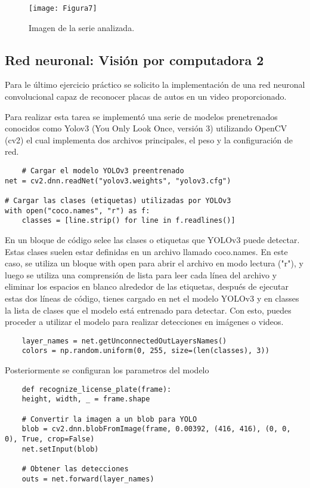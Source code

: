 \documentclass[a4paper,
               ]{jacow}
\begin{document}
\begin{figure}[!htb]
   \centering
   \captionsetup{justification=centering}
    \texttt{[image: Figura7]}
    \caption{Imagen de la serie analizada.}
\end{figure}

\subsection{Red neuronal: Visión por computadora 2}
Para le último ejercicio práctico se solicito la implementación de una red neuronal convolucional capaz de reconocer placas de autos en un video proporcionado. 

Para realizar esta tarea se implementó una serie de modelos prenetrenados conocidos como Yolov3 (You Only Look Once, versión 3) utilizando OpenCV (cv2) el cual implementa dos archivos principales, el peso y la configuración de red.

\begin{lstlisting}
    # Cargar el modelo YOLOv3 preentrenado
net = cv2.dnn.readNet("yolov3.weights", "yolov3.cfg")

# Cargar las clases (etiquetas) utilizadas por YOLOv3
with open("coco.names", "r") as f:
    classes = [line.strip() for line in f.readlines()]
\end{lstlisting}

En un bloque de código selee las clases o etiquetas que YOLOv3 puede detectar. Estas clases suelen estar definidas en un archivo llamado coco.names. En este caso, se utiliza un bloque with open para abrir el archivo en modo lectura ("r"), y luego se utiliza una comprensión de lista para leer cada línea del archivo y eliminar los espacios en blanco alrededor de las etiquetas, después de ejecutar estas dos líneas de código, tienes cargado en net el modelo YOLOv3 y en classes la lista de clases que el modelo está entrenado para detectar. Con esto, puedes proceder a utilizar el modelo para realizar detecciones en imágenes o videos.

\begin{lstlisting}
    layer_names = net.getUnconnectedOutLayersNames()
    colors = np.random.uniform(0, 255, size=(len(classes), 3))
\end{lstlisting}

Posteriormente se configuran los parametros del modelo

\begin{lstlisting}
    def recognize_license_plate(frame):
    height, width, _ = frame.shape

    # Convertir la imagen a un blob para YOLO
    blob = cv2.dnn.blobFromImage(frame, 0.00392, (416, 416), (0, 0, 0), True, crop=False)
    net.setInput(blob)

    # Obtener las detecciones
    outs = net.forward(layer_names)
\end{lstlisting}
\end{document}
